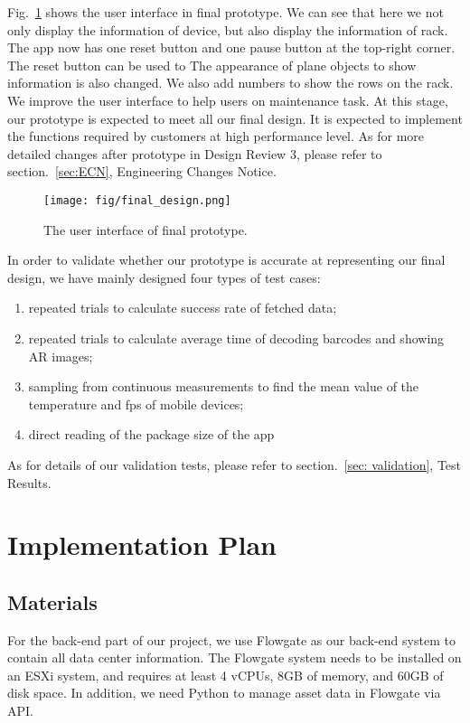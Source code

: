 \documentclass[11pt,a4paper]{article}
\begin{document}
\begin{onehalfspace}
Fig.~\ref{fig:finaldesign} shows the user interface in final prototype. We can see that here we not only display the information of device, but also display the information of rack. The app now has one reset button and one pause button at the top-right corner. The reset button can be used to The appearance of plane objects to show information is also changed. We also add numbers to show the rows on the rack. We improve the user interface to help users on maintenance task.
At this stage, our prototype is expected to meet all our final design. It is expected to implement the functions required by customers at high performance level. As for more detailed changes after prototype in Design Review 3, please refer to section.~\ref{sec:ECN}, Engineering Changes Notice.
\begin{figure}[H]
    \centering
    \texttt{[image: fig/final\_design.png]}
    \caption{The user interface of final prototype.}
    \label{fig:finaldesign}
\end{figure}    

In order to validate whether our prototype is accurate at representing our final design, we have mainly designed four types of test cases: 
\begin{enumerate}
    \item repeated trials to calculate success rate of fetched data;
    \item repeated trials to calculate average time of decoding barcodes and showing AR images;
    \item sampling from continuous measurements to find the mean value of the temperature and fps of mobile devices;
    \item direct reading of the package size of the app
\end{enumerate}

As for details of our validation tests, please refer to section.~\ref{sec: validation}, Test Results.


\section{Implementation Plan}\label{implement}
\subsection{Materials}
For the back-end part of our project, we use Flowgate as our back-end system to contain all data center information. The Flowgate system needs to be installed on an ESXi system, and requires at least 4 vCPUs, 8GB of memory, and 60GB of disk space. In addition, we need Python to manage asset data in Flowgate via API.


\end{onehalfspace}
\end{document}
